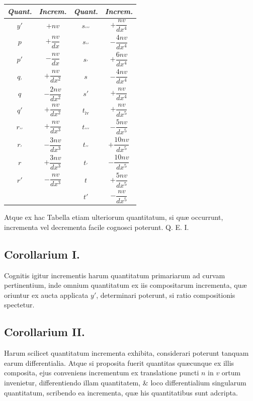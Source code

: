 \begin{center}
\begin{tabular}{c|c@{\qquad}c|c}
\textit{Quant.}&\textit{Increm.}&\textit{Quant.}&\textit{Increm.}\\ \hline
$y'$&$+nv$&$s_{\prime\prime\prime}$&$+\dfrac{nv}{dx^4}$\\[5pt]
$p$&$+\dfrac{nv}{dx}$&$s_{\prime\prime}$&$-\dfrac{4nv}{dx^4}$\\[5pt]
$p'$&$-\dfrac{nv}{dx}$&$s_{\prime}$&$+\dfrac{6nv}{dx^4}$\\[5pt]
$q_{\prime}$&$+\dfrac{nv}{dx^2}$&$s$&$-\dfrac{4nv}{dx^4}$\\[5pt]
$q$&$-\dfrac{2nv}{dx^2}$&$s'$&$+\dfrac{nv}{dx^4}$\\[5pt]
$q'$&$+\dfrac{nv}{dx^2}$&$t_{\mathrm{iv}}$&$+\dfrac{nv}{dx^5}$\\[5pt]
$r_{\prime\prime}$&$+\dfrac{nv}{dx^3}$&$t_{\prime\prime\prime}$&$-\dfrac{5nv}{dx^5}$\\[5pt]
$r_{\prime}$&$-\dfrac{3nv}{dx^3}$&$t_{\prime\prime}$&$+\dfrac{10nv}{dx^5}$\\[5pt]
$r$&$+\dfrac{3nv}{dx^3}$&$t_{\prime}$&$-\dfrac{10nv}{dx^5}$\\[5pt]
$r'$&$-\dfrac{nv}{dx^3}$&$t$&$+\dfrac{5nv}{dx^5}$\\[5pt]
&&$t'$&$-\dfrac{nv}{dx^5}$\\[5pt]
\end{tabular}
\end{center}
Atque ex hac Tabella etiam ulteriorum quantitatum, si quæ occurrunt, incrementa vel decrementa facile cognosci poterunt. Q. E. I.

\subsection*{Corollarium I.}
Cognitis igitur incrementis harum quantitatum primariarum ad curvam pertinentium, inde omnium quantitatum ex iis compositarum incrementa, quæ oriuntur ex aucta applicata $y'$, determinari poterunt, si ratio compositionis spectetur.

\subsection*{Corollarium II.}
Harum scilicet quantitatum incrementa exhibita, considerari poterunt tanquam earum differentialia. Atque si proposita fuerit quantitas quæcunque ex illis composita, ejus conveniens incrementum ex translatione puncti $n$ in $v$ ortum invenietur, differentiendo illam quantitatem, \& loco differentialium singularum quantitatum, scribendo ea incrementa, quæ his quantitatibus sunt adcripta.

